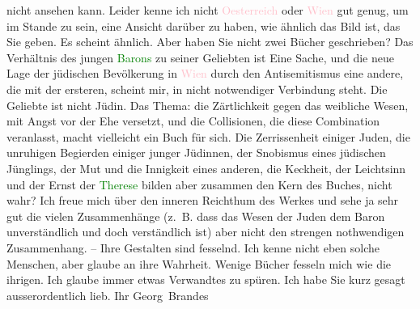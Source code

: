                     nicht ansehen kann.\pend
           \pstart
           Leider kenne ich nicht \textcolor{pink}{Oesterreich}{}\ledrightnote{\textcolor{pink}{Österreich}} oder \textcolor{pink}{Wien}{}\ledrightnote{\textcolor{pink}{Wien}} gut genug, um im Stande zu sein, eine
                    Ansicht darüber zu haben, wie ähnlich das Bild ist, das Sie geben. Es scheint
                    ähnlich. Aber haben Sie nicht zwei Bücher geschrieben? Das Verhältnis des jungen
                        \textcolor{green}{Barons}{} zu seiner
                    Geliebten ist Eine Sache, und die {\pb}neue Lage der jüdischen
                    Bevölkerung in \textcolor{pink}{Wien}{}\ledrightnote{\textcolor{pink}{Wien}} durch den Antisemitismus
                    eine andere, die mit der ersteren, scheint mir, in nicht notwendiger Verbindung
                    steht. Die Geliebte ist nicht Jüdin.\pend
           \pstart
           Das Thema: die Zärtlichkeit gegen das weibliche Wesen, mit Angst vor der Ehe
                    versetzt, und die Collisionen, die diese Combination veranlasst,  macht vielleicht ein Buch für sich. Die
                    Zerrissenheit einiger Juden, die unruhigen Begierden einiger junger Jüdinnen,
                    der Snobismus eines jüdischen Jünglings, der {\pb}Mut und die Innigkeit eines
                    anderen, die Keckheit, der Leichtsinn und der Ernst der \textcolor{green}{Therese}{} bilden aber zusammen den Kern
                    des Buches, nicht wahr? Ich freue mich über den inneren Reichthum des Werkes und
                    sehe ja sehr gut die vielen Zusammenhänge (z. B. dass das Wesen der Juden dem
                    Baron unverständlich und doch verständlich ist) aber nicht den strengen
                    nothwendigen Zusammenhang. – Ihre Gestalten sind fesselnd. Ich kenne nicht eben
                    solche Menschen, aber glaube an ihre Wahrheit.\pend
           \pstart
           Wenige Bücher fesseln mich wie die ihrigen. Ich glaube immer etwas Verwandtes zu
                    spüren.\pend
           \pstart
           Ich habe Sie kurz gesagt ausserordentlich lieb.\pend
           \pstart Ihr \spacefill\mbox{Georg Brandes}\pend{}\endnumbering{}  
      